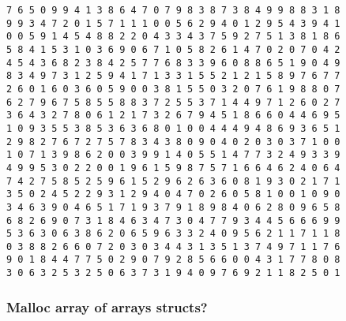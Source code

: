 \documentclass[11pt]{article}
\begin{document}
\begin{verbatim}
7 6 5 0 9 9 4 1 3 8 6 4 7 0 7 9 8 3 8 7 3 8 4 9 9 8 8 3 1 8 
9 9 3 4 7 2 0 1 5 7 1 1 1 0 0 5 6 2 9 4 0 1 2 9 5 4 3 9 4 1 
0 0 5 9 1 4 5 4 8 8 2 2 0 4 3 3 4 3 7 5 9 2 7 5 1 3 8 1 8 6 
5 8 4 1 5 3 1 0 3 6 9 0 6 7 1 0 5 8 2 6 1 4 7 0 2 0 7 0 4 2 
4 5 4 3 6 8 2 3 8 4 2 5 7 7 6 8 3 3 9 6 0 8 8 6 5 1 9 0 4 9 
8 3 4 9 7 3 1 2 5 9 4 1 7 1 3 3 1 5 5 2 1 2 1 5 8 9 7 6 7 7 
2 6 0 1 6 0 3 6 0 5 9 0 0 3 8 1 5 5 0 3 2 0 7 6 1 9 8 8 0 7 
6 2 7 9 6 7 5 8 5 5 8 8 3 7 2 5 5 3 7 1 4 4 9 7 1 2 6 0 2 7 
3 6 4 3 2 7 8 0 6 1 2 1 7 3 2 6 7 9 4 5 1 8 6 6 0 4 4 6 9 5 
1 0 9 3 5 5 3 8 5 3 6 3 6 8 0 1 0 0 4 4 4 9 4 8 6 9 3 6 5 1 
2 9 8 2 7 6 7 2 7 5 7 8 3 4 3 8 0 9 0 4 0 2 0 3 0 3 7 1 0 0 
1 0 7 1 3 9 8 6 2 0 0 3 9 9 1 4 0 5 5 1 4 7 7 3 2 4 9 3 3 9 
4 9 9 5 3 0 2 2 0 0 1 9 6 1 5 9 8 7 5 7 1 6 6 4 6 2 4 0 6 4 
7 4 2 7 5 8 5 2 5 9 6 1 5 2 9 6 2 6 3 6 0 8 1 9 3 0 2 1 7 1 
3 5 0 2 4 5 2 2 9 3 1 2 9 4 0 4 7 0 2 6 0 5 8 1 0 0 1 0 9 0 
3 4 6 3 9 0 4 6 5 1 7 1 9 3 7 9 1 8 9 8 4 0 6 2 8 0 9 6 5 8 
6 8 2 6 9 0 7 3 1 8 4 6 3 4 7 3 0 4 7 7 9 3 4 4 5 6 6 6 9 9 
5 3 6 3 0 6 3 8 6 2 0 6 5 9 6 3 3 2 4 0 9 5 6 2 1 1 7 1 1 8 
0 3 8 8 2 6 6 0 7 2 0 3 0 3 4 4 3 1 3 5 1 3 7 4 9 7 1 1 7 6 
9 0 1 8 4 4 7 7 5 0 2 9 0 7 9 2 8 5 6 6 0 0 4 3 1 7 7 8 0 8 
3 0 6 3 2 5 3 2 5 0 6 3 7 3 1 9 4 0 9 7 6 9 2 1 1 8 2 5 0 1
\end{verbatim}


\subsubsection{Malloc array of arrays structs?}
\label{sec:orgc2c774e}
\end{document}
